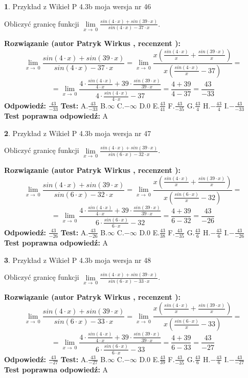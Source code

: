 \documentclass[12pt, a4paper]{article}
\theoremstyle{definition} %
\newtheorem{zad}{}
\newcommand{\zadStart}[1]{\begin{zad}#1\newline}
\newcommand{\zadStop}{\end{zad}}
\newcommand{\rozwStart}[2]{\noindent \textbf{Rozwiązanie (autor #1 , recenzent #2): }\newline}
\newcommand{\rozwStop}{\newline}
\newcommand{\odpStart}{\noindent \textbf{Odpowiedź:}\newline}
\newcommand{\odpStop}{\newline}
\newcommand{\testStart}{\noindent \textbf{Test:}\newline}
\newcommand{\testStop}{\newline}
\newcommand{\kluczStart}{\noindent \textbf{Test poprawna odpowiedź:}\newline}
\newcommand{\kluczStop}{\newline}
\begin{document}
\zadStart{Przykład z Wikieł P 4.3b moja wersja nr 46}


Obliczyć granicę funkcji $\lim\limits_{x\to\ 0}\frac{sin(4 \cdot x)+sin(39 \cdot x)}{sin(4 \cdot x)-37 \cdot x}$.
\zadStop
\rozwStart{Patryk Wirkus}{}
$$\lim\limits_{x\to\ 0}\frac{sin(4 \cdot x)+sin(39 \cdot x)}{sin(4 \cdot x)-37 \cdot x}=\lim\limits_{x\to\ 0}\frac{x(\frac{sin(4 \cdot x)}{x}+\frac{sin(39 \cdot x)}{x})}{x(\frac{sin(4 \cdot x)}{x}-37)}=$$
$$=\lim\limits_{x\to\ 0}\frac{4 \cdot \frac{sin(4 \cdot x)}{4 \cdot x}+39 \cdot \frac{sin(39 \cdot x)}{39 \cdot x}}{4 \cdot \frac{sin(4 \cdot x)}{4 \cdot x}-37}=\frac{4+39}{4-37} = \frac{43}{-33}$$
\rozwStop
\odpStart
$\frac{43}{-33}$
\odpStop
\testStart
A.$\frac{43}{-33}$
B.$\infty$
C.$-\infty$
D.$0$
E.$\frac{43}{41}$
F.$\frac{43}{-35}$
G.$\frac{43}{4}$
H.$-\frac{43}{4}$
I.$-\frac{43}{-33}$
\testStop
\kluczStart
A
\kluczStop



\zadStart{Przykład z Wikieł P 4.3b moja wersja nr 47}


Obliczyć granicę funkcji $\lim\limits_{x\to\ 0}\frac{sin(4 \cdot x)+sin(39 \cdot x)}{sin(6 \cdot x)-32 \cdot x}$.
\zadStop
\rozwStart{Patryk Wirkus}{}
$$\lim\limits_{x\to\ 0}\frac{sin(4 \cdot x)+sin(39 \cdot x)}{sin(6 \cdot x)-32 \cdot x}=\lim\limits_{x\to\ 0}\frac{x(\frac{sin(4 \cdot x)}{x}+\frac{sin(39 \cdot x)}{x})}{x(\frac{sin(6 \cdot x)}{x}-32)}=$$
$$=\lim\limits_{x\to\ 0}\frac{4 \cdot \frac{sin(4 \cdot x)}{4 \cdot x}+39 \cdot \frac{sin(39 \cdot x)}{39 \cdot x}}{6 \cdot \frac{sin(6 \cdot x)}{6 \cdot x}-32}=\frac{4+39}{6-32} = \frac{43}{-26}$$
\rozwStop
\odpStart
$\frac{43}{-26}$
\odpStop
\testStart
A.$\frac{43}{-26}$
B.$\infty$
C.$-\infty$
D.$0$
E.$\frac{43}{38}$
F.$\frac{43}{-35}$
G.$\frac{43}{6}$
H.$-\frac{43}{6}$
I.$-\frac{43}{-26}$
\testStop
\kluczStart
A
\kluczStop



\zadStart{Przykład z Wikieł P 4.3b moja wersja nr 48}


Obliczyć granicę funkcji $\lim\limits_{x\to\ 0}\frac{sin(4 \cdot x)+sin(39 \cdot x)}{sin(6 \cdot x)-33 \cdot x}$.
\zadStop
\rozwStart{Patryk Wirkus}{}
$$\lim\limits_{x\to\ 0}\frac{sin(4 \cdot x)+sin(39 \cdot x)}{sin(6 \cdot x)-33 \cdot x}=\lim\limits_{x\to\ 0}\frac{x(\frac{sin(4 \cdot x)}{x}+\frac{sin(39 \cdot x)}{x})}{x(\frac{sin(6 \cdot x)}{x}-33)}=$$
$$=\lim\limits_{x\to\ 0}\frac{4 \cdot \frac{sin(4 \cdot x)}{4 \cdot x}+39 \cdot \frac{sin(39 \cdot x)}{39 \cdot x}}{6 \cdot \frac{sin(6 \cdot x)}{6 \cdot x}-33}=\frac{4+39}{6-33} = \frac{43}{-27}$$
\rozwStop
\odpStart
$\frac{43}{-27}$
\odpStop
\testStart
A.$\frac{43}{-27}$
B.$\infty$
C.$-\infty$
D.$0$
E.$\frac{43}{39}$
F.$\frac{43}{-35}$
G.$\frac{43}{6}$
H.$-\frac{43}{6}$
I.$-\frac{43}{-27}$
\testStop
\kluczStart
A
\kluczStop
\end{document}
